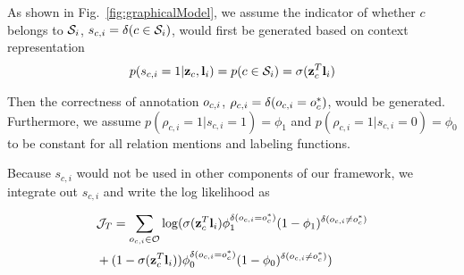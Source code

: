 As shown in Fig.~\ref{fig:graphicalModel}, we assume the indicator of whether $c$ belongs to $\S_i$, $s_{c, i} = \delta(c \in \S_i)$, would first be generated based on context representation 
\begin{align}
p(s_{c, i} = 1 | \z_c, \l_i) = p(c \in \S_i) = \sigma(\z_c^T \l_i) \label{eqn:gene_d}
\end{align}

Then the correctness of annotation $\ob_{c, i}$, $\rho_{c, i} = \delta(\ob_{c, i} = \ob_c^*)$, would be generated. Furthermore, we assume $p(\rho_{c, i} = 1 | s_{c, i} = 1) = \phi_1$ and $p(\rho_{c, i} = 1 | s_{c, i} = 0) = \phi_0$ to be constant for all relation mentions and labeling functions.

Because $s_{c, i}$ would not be used in other components of our framework, we integrate out $s_{c, i}$ and write the log likelihood as

\begin{small}
\begin{align}
&\mathcal{J}_T =\sum_{\ob_{c, i} \in \O} \log(\sigma(\z_c^T \l_i)\phi_1^{ \delta(\ob_{c, i} = \ob_c^*)}(1-\phi_1)^{\delta(\ob_{c, i} \neq \ob_c^*)}\nonumber\\
&+(1-\sigma(\z_c^T \l_i))\phi_0^{\delta(\ob_{c, i} = \ob_c^*)}(1-\phi_0)^{\delta(\ob_{c, i} \neq \ob_c^*)}) \label{eqn:truth_ciscovery}
\end{align}
\end{small}

